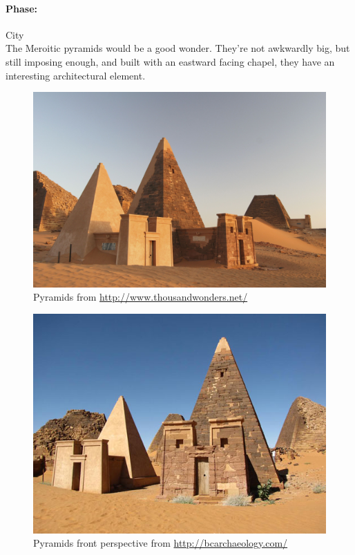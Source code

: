 \documentclass[a4paper,12pt]{scrreprt}
\begin{document}
\paragraph{Phase:} City\\

The Meroitic pyramids would be a good wonder. They’re not awkwardly big, but still imposing enough, and built with an eastward facing chapel, they have an interesting architectural element.

\begin{figure}[H]
	\centering
	\includegraphics[width=\textwidth]{img/wonder/nubian_pyramids_original}
	\caption{Pyramids from \url{http://www.thousandwonders.net/}}
\end{figure}

\begin{figure}[H]
	\centering
	\includegraphics[width=\textwidth]{img/wonder/meroe-pyramids}
	\caption{Pyramids front perspective from \url{http://bcarchaeology.com/}}
\end{figure}
\end{document}
